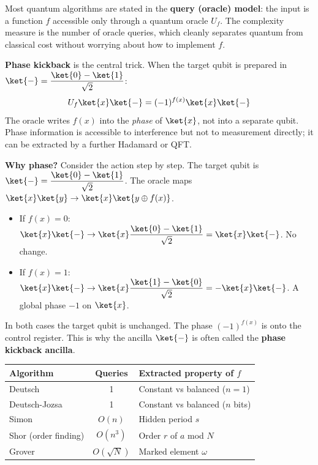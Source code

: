 \documentclass[oneside]{academica}
\begin{document}
Most quantum algorithms are stated in the \textbf{query (oracle) model}: the input is a function $f$ accessible only through a quantum oracle $U_f$.
The complexity measure is the number of oracle queries, which cleanly separates quantum from classical cost without worrying about how to implement $f$.

\textbf{Phase kickback} is the central trick.
When the target qubit is prepared in $\displaystyle \ket{-}=\frac{\ket{0}-\ket{1}}{\sqrt{2}}$:
\begin{equation*}
  U_f\ket{x}\ket{-}=(-1)^{f(x)}\ket{x}\ket{-}
\end{equation*}
The oracle writes $f(x)$ into the \emph{phase} of $\ket{x}$, not into a separate qubit.
Phase information is accessible to interference but not to measurement directly; it can be extracted by a further Hadamard or QFT.

\textbf{Why phase?}  Consider the action step by step.
The target qubit is $\displaystyle\ket{-}=\frac{\ket{0}-\ket{1}}{\sqrt{2}}$.
The oracle maps $\ket{x}\ket{y}\to\ket{x}\ket{y\oplus f(x)}$.
\begin{itemize}
  \item If $f(x)=0$: $\displaystyle \ket{x}\ket{-}\to\ket{x}\frac{\ket{0}-\ket{1}}{\sqrt{2}}=\ket{x}\ket{-}$. No change.
  \item If $f(x)=1$: $\displaystyle \ket{x}\ket{-}\to\ket{x}\frac{\ket{1}-\ket{0}}{\sqrt{2}}=-\ket{x}\ket{-}$. A global phase $-1$ on $\ket{x}$.
\end{itemize}
In both cases the target qubit is unchanged.
The phase $(-1)^{f(x)}$ is  onto the control register.
This is why the ancilla $\ket{-}$ is often called the \textbf{phase kickback ancilla}.

\begin{center}
\renewcommand{\arraystretch}{1.3}
\begin{tabular}{l|c|l}
  \textbf{Algorithm} & \textbf{Queries} & \textbf{Extracted property of $f$} \\
  \hline
  Deutsch & 1 & Constant vs balanced ($n=1$) \\
  Deutsch-Jozsa & 1 & Constant vs balanced ($n$ bits) \\
  Simon & $O(n)$ & Hidden period $s$ \\
  Shor (order finding) & $O(n^3)$ & Order $r$ of $a$ mod $N$ \\
  Grover & $O(\sqrt{N})$ & Marked element $\omega$ \\
\end{tabular}
\end{center}
\end{document}
